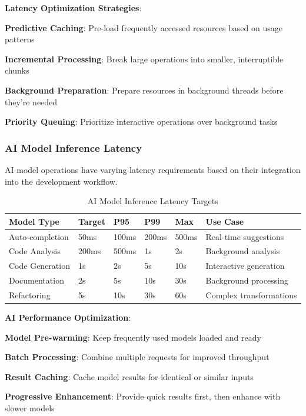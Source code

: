 \textbf{Latency Optimization Strategies}:
\begin{compactlist}
    \item \textbf{Predictive Caching}: Pre-load frequently accessed resources based on usage patterns
    \item \textbf{Incremental Processing}: Break large operations into smaller, interruptible chunks
    \item \textbf{Background Preparation}: Prepare resources in background threads before they're needed
    \item \textbf{Priority Queuing}: Prioritize interactive operations over background tasks
\end{compactlist}

\subsubsection*{AI Model Inference Latency}

AI model operations have varying latency requirements based on their integration into the development workflow.

\begin{table}[h]
\centering
\caption{AI Model Inference Latency Targets}
\label{tab:ai-latency}
\begin{tabular}{@{}llllll@{}}
\toprule
\textbf{Model Type} & \textbf{Target} & \textbf{P95} & \textbf{P99} & \textbf{Max} & \textbf{Use Case} \\
\midrule
Auto-completion & 50ms & 100ms & 200ms & 500ms & Real-time suggestions \\
Code Analysis & 200ms & 500ms & 1s & 2s & Background analysis \\
Code Generation & 1s & 2s & 5s & 10s & Interactive generation \\
Documentation & 2s & 5s & 10s & 30s & Background processing \\
Refactoring & 5s & 10s & 30s & 60s & Complex transformations \\
\bottomrule
\end{tabular}
\end{table}

\textbf{AI Performance Optimization}:
\begin{compactlist}
    \item \textbf{Model Pre-warming}: Keep frequently used models loaded and ready
    \item \textbf{Batch Processing}: Combine multiple requests for improved throughput
    \item \textbf{Result Caching}: Cache model results for identical or similar inputs
    \item \textbf{Progressive Enhancement}: Provide quick results first, then enhance with slower models
\end{compactlist}

